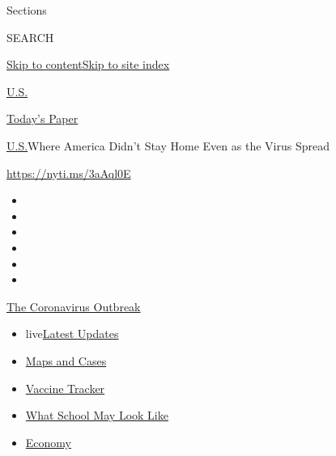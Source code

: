 Sections

SEARCH

\protect\hyperlink{site-content}{Skip to
content}\protect\hyperlink{site-index}{Skip to site index}

\href{https://www.nytimes.com/section/us}{U.S.}

\href{https://myaccount.nytimes.com/auth/login?response_type=cookie\&client_id=vi}{}

\href{https://www.nytimes.com/section/todayspaper}{Today's Paper}

\href{/section/us}{U.S.}\textbar{}Where America Didn't Stay Home Even as
the Virus Spread

\url{https://nyti.ms/3aAql0E}

\begin{itemize}
\item
\item
\item
\item
\item
\item
\end{itemize}

\href{https://www.nytimes.com/news-event/coronavirus?action=click\&pgtype=Article\&state=default\&region=TOP_BANNER\&context=storylines_menu}{The
Coronavirus Outbreak}

\begin{itemize}
\tightlist
\item
  live\href{https://www.nytimes.com/2020/08/02/world/coronavirus-updates.html?action=click\&pgtype=Article\&state=default\&region=TOP_BANNER\&context=storylines_menu}{Latest
  Updates}
\item
  \href{https://www.nytimes.com/interactive/2020/us/coronavirus-us-cases.html?action=click\&pgtype=Article\&state=default\&region=TOP_BANNER\&context=storylines_menu}{Maps
  and Cases}
\item
  \href{https://www.nytimes.com/interactive/2020/science/coronavirus-vaccine-tracker.html?action=click\&pgtype=Article\&state=default\&region=TOP_BANNER\&context=storylines_menu}{Vaccine
  Tracker}
\item
  \href{https://www.nytimes.com/interactive/2020/07/29/us/schools-reopening-coronavirus.html?action=click\&pgtype=Article\&state=default\&region=TOP_BANNER\&context=storylines_menu}{What
  School May Look Like}
\item
  \href{https://www.nytimes.com/live/2020/07/31/business/stock-market-today-coronavirus?action=click\&pgtype=Article\&state=default\&region=TOP_BANNER\&context=storylines_menu}{Economy}
\end{itemize}

